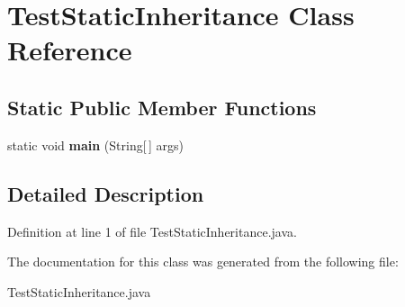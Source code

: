 \section{Test\-Static\-Inheritance Class Reference}
\label{classTestStaticInheritance}
\subsection*{Static Public Member Functions}
\begin{CompactItemize}
\item 
static void {\bf main} (String[$\,$] args)\label{classTestStaticInheritance_60f6eaba2fae20b0f0a0eebcb957988d}

\end{CompactItemize}


\subsection{Detailed Description}




Definition at line 1 of file Test\-Static\-Inheritance.java.

The documentation for this class was generated from the following file:\begin{CompactItemize}
\item 
Test\-Static\-Inheritance.java\end{CompactItemize}

